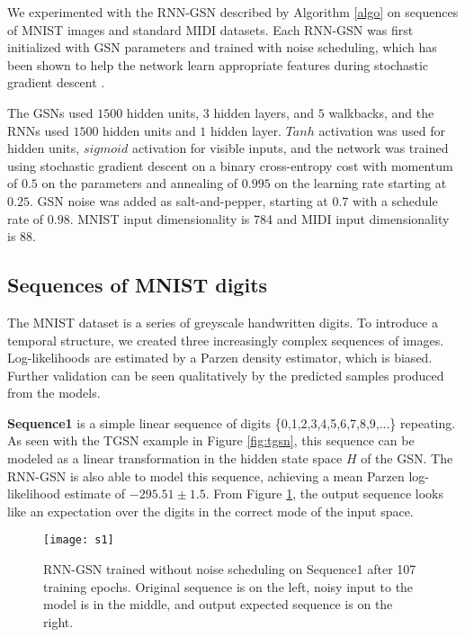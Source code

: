 We experimented with the RNN-GSN described by Algorithm \ref{algo} on sequences of MNIST images and standard MIDI datasets.
Each RNN-GSN was first initialized with GSN parameters and trained with noise scheduling, which has been shown to help the network learn appropriate features during stochastic gradient descent \cite{noise_schedule}.

The GSNs used $1500$ hidden units, $3$ hidden layers, and $5$ walkbacks, and the RNNs used $1500$ hidden units and $1$ hidden layer. $Tanh$ activation was used for hidden units, $sigmoid$ activation for visible inputs, and the network was trained using stochastic gradient descent on a binary cross-entropy cost with momentum of $0.5$ on the parameters and annealing of $0.995$ on the learning rate starting at $0.25$. GSN noise was added as salt-and-pepper, starting at $0.7$ with a schedule rate of $0.98$. MNIST input dimensionality is 784 and MIDI input dimensionality is 88.
\subsection{Sequences of MNIST digits}
The MNIST dataset is a series of greyscale handwritten digits. To introduce a temporal structure, we created three increasingly complex sequences of images. Log-likelihoods are estimated by a Parzen density estimator, which is biased. Further validation can be seen qualitatively by the predicted samples produced from the models.

\textbf{Sequence1} is a simple linear sequence of digits \{0,1,2,3,4,5,6,7,8,9,...\} repeating. As seen with the TGSN example in Figure \ref{fig:tgsn}, this sequence can be modeled as a linear transformation in the hidden state space $H$ of the GSN. The RNN-GSN is also able to model this sequence, achieving a mean Parzen log-likelihood estimate of $-295.51 \pm 1.5$. From Figure \ref{fig:s1}, the output sequence looks like an expectation over the digits in the correct mode of the input space.
\begin{figure}[h!]
  \centering
    \texttt{[image: s1]}
\caption{RNN-GSN trained without noise scheduling on Sequence1 after 107 training epochs. Original sequence is on the left, noisy input to the model is in the middle, and output expected sequence is on the right.}\label{fig:s1}
\end{figure}

